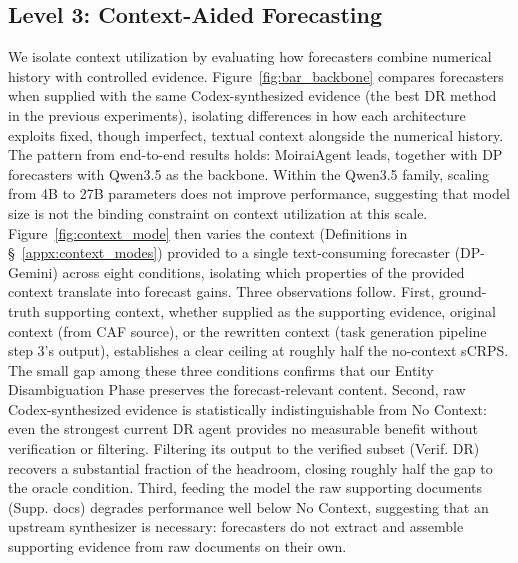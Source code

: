 \documentclass[]{servicenow}
\begin{document}
\subsection{Level 3: Context-Aided Forecasting}
We isolate context utilization by evaluating how forecasters combine numerical history with controlled evidence. 
Figure~\ref{fig:bar_backbone} compares forecasters when supplied with the same Codex-synthesized evidence (the best DR method in the previous experiments), isolating differences in how each architecture exploits fixed, though imperfect, textual context alongside the numerical history. 
The pattern from end-to-end results holds: MoiraiAgent leads, together with DP forecasters with Qwen3.5 as the backbone.
Within the Qwen3.5 family, scaling from 4B to 27B parameters does not improve performance, suggesting that model size is not the binding constraint on context utilization at this scale. 
Figure~\ref{fig:context_mode} then varies the context (Definitions in \S~\ref{appx:context_modes}) provided to a single text-consuming forecaster (DP-Gemini) across eight conditions, isolating which properties of the provided context translate into forecast gains. 
Three observations follow. First, ground-truth supporting context, whether supplied as the supporting evidence, original context (from CAF source), or the rewritten context (task generation pipeline step 3's output), establishes a clear ceiling at roughly half the no-context sCRPS. The small gap among these three conditions confirms that our Entity Disambiguation Phase preserves the forecast-relevant content. 
Second, raw Codex-synthesized evidence is statistically indistinguishable from No Context: even the strongest current DR agent provides no measurable benefit without verification or filtering. 
Filtering its output to the verified subset (Verif. DR) recovers a substantial fraction of the headroom, closing roughly half the gap to the oracle condition. 
Third, feeding the model the raw supporting documents (Supp. docs) degrades performance well below No Context, suggesting that an upstream synthesizer is necessary: forecasters do not extract and assemble supporting evidence from raw documents on their own.
\end{document}
